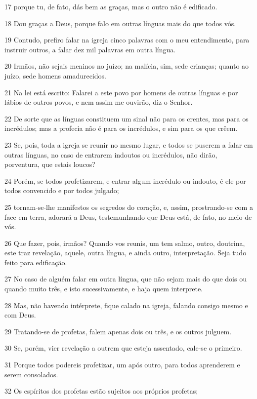 \par 17 porque tu, de fato, dás bem as graças, mas o outro não é edificado.
\par 18 Dou graças a Deus, porque falo em outras línguas mais do que todos vós.
\par 19 Contudo, prefiro falar na igreja cinco palavras com o meu entendimento, para instruir outros, a falar dez mil palavras em outra língua.
\par 20 Irmãos, não sejais meninos no juízo; na malícia, sim, sede crianças; quanto ao juízo, sede homens amadurecidos.
\par 21 Na lei está escrito: Falarei a este povo por homens de outras línguas e por lábios de outros povos, e nem assim me ouvirão, diz o Senhor.
\par 22 De sorte que as línguas constituem um sinal não para os crentes, mas para os incrédulos; mas a profecia não é para os incrédulos, e sim para os que crêem.
\par 23 Se, pois, toda a igreja se reunir no mesmo lugar, e todos se puserem a falar em outras línguas, no caso de entrarem indoutos ou incrédulos, não dirão, porventura, que estais loucos?
\par 24 Porém, se todos profetizarem, e entrar algum incrédulo ou indouto, é ele por todos convencido e por todos julgado;
\par 25 tornam-se-lhe manifestos os segredos do coração, e, assim, prostrando-se com a face em terra, adorará a Deus, testemunhando que Deus está, de fato, no meio de vós.
\par 26 Que fazer, pois, irmãos? Quando vos reunis, um tem salmo, outro, doutrina, este traz revelação, aquele, outra língua, e ainda outro, interpretação. Seja tudo feito para edificação.
\par 27 No caso de alguém falar em outra língua, que não sejam mais do que dois ou quando muito três, e isto sucessivamente, e haja quem interprete.
\par 28 Mas, não havendo intérprete, fique calado na igreja, falando consigo mesmo e com Deus.
\par 29 Tratando-se de profetas, falem apenas dois ou três, e os outros julguem.
\par 30 Se, porém, vier revelação a outrem que esteja assentado, cale-se o primeiro.
\par 31 Porque todos podereis profetizar, um após outro, para todos aprenderem e serem consolados.
\par 32 Os espíritos dos profetas estão sujeitos aos próprios profetas;
